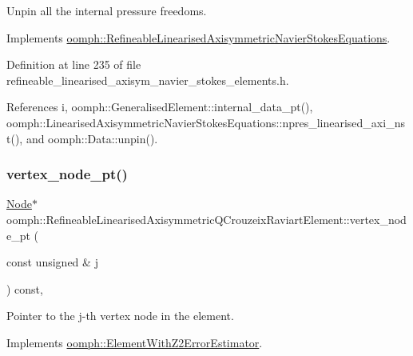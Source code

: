 Unpin all the internal pressure freedoms. 



Implements \hyperlink{classoomph_1_1RefineableLinearisedAxisymmetricNavierStokesEquations_a7a0d635c46d7faabe63c432b3435455d}{oomph\+::\+Refineable\+Linearised\+Axisymmetric\+Navier\+Stokes\+Equations}.



Definition at line 235 of file refineable\+\_\+linearised\+\_\+axisym\+\_\+navier\+\_\+stokes\+\_\+elements.\+h.



References i, oomph\+::\+Generalised\+Element\+::internal\+\_\+data\+\_\+pt(), oomph\+::\+Linearised\+Axisymmetric\+Navier\+Stokes\+Equations\+::npres\+\_\+linearised\+\_\+axi\+\_\+nst(), and oomph\+::\+Data\+::unpin().

\mbox{\label{classoomph_1_1RefineableLinearisedAxisymmetricQCrouzeixRaviartElement_ad04e4eabf235314ccea7b856cb4e3ef6}} 
\subsubsection{\texorpdfstring{vertex\+\_\+node\+\_\+pt()}{vertex\_node\_pt()}}
{\footnotesize\ttfamily \hyperlink{classoomph_1_1Node}{Node}$\ast$ oomph\+::\+Refineable\+Linearised\+Axisymmetric\+Q\+Crouzeix\+Raviart\+Element\+::vertex\+\_\+node\+\_\+pt (\begin{DoxyParamCaption}\item[{const unsigned \&}]{j }\end{DoxyParamCaption}) const\hspace{0.3cm}{\ttfamily [inline]}, {\ttfamily [virtual]}}



Pointer to the j-\/th vertex node in the element. 



Implements \hyperlink{classoomph_1_1ElementWithZ2ErrorEstimator_a0eedccc33519f852c5dc2055ddf2774b}{oomph\+::\+Element\+With\+Z2\+Error\+Estimator}.



